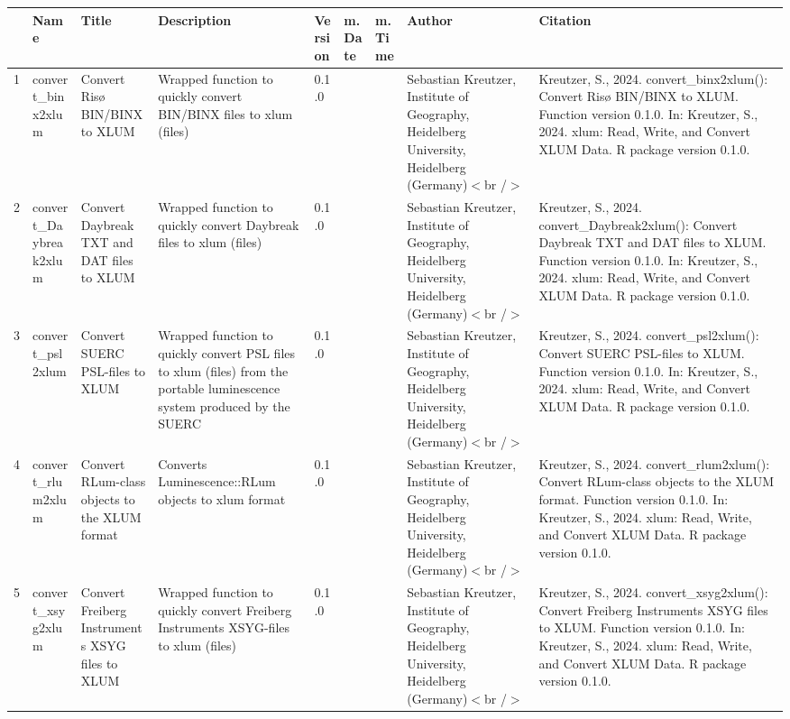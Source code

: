 \begin{table}[ht]
\centering
\begin{tabular}{rllllllll}
  \hline
 & Name & Title & Description & Version & m.Date & m.Time & Author & Citation \\ 
  \hline
1 & convert\_binx2xlum & Convert Risø BIN/BINX to XLUM & Wrapped function to quickly convert BIN/BINX files to  xlum  (files) & 0.1.0
 &  &  & Sebastian Kreutzer, Institute of Geography, Heidelberg University, Heidelberg (Germany)$<$br /$>$ & Kreutzer, S., 2024. convert\_binx2xlum(): Convert Risø BIN/BINX to XLUM. Function version 0.1.0. In: Kreutzer, S., 2024. xlum: Read, Write, and Convert XLUM Data. R package version 0.1.0. 
 \\ 
  2 & convert\_Daybreak2xlum & Convert Daybreak TXT and DAT files to XLUM & Wrapped function to quickly convert Daybreak files to  xlum  (files) & 0.1.0
 &  &  & Sebastian Kreutzer, Institute of Geography, Heidelberg University, Heidelberg (Germany)$<$br /$>$ & Kreutzer, S., 2024. convert\_Daybreak2xlum(): Convert Daybreak TXT and DAT files to XLUM. Function version 0.1.0. In: Kreutzer, S., 2024. xlum: Read, Write, and Convert XLUM Data. R package version 0.1.0. 
 \\ 
  3 & convert\_psl2xlum & Convert SUERC PSL-files to XLUM & Wrapped function to quickly convert PSL files to  xlum  (files) from the portable luminescence system produced by the SUERC & 0.1.0
 &  &  & Sebastian Kreutzer, Institute of Geography, Heidelberg University, Heidelberg (Germany)$<$br /$>$ & Kreutzer, S., 2024. convert\_psl2xlum(): Convert SUERC PSL-files to XLUM. Function version 0.1.0. In: Kreutzer, S., 2024. xlum: Read, Write, and Convert XLUM Data. R package version 0.1.0. 
 \\ 
  4 & convert\_rlum2xlum & Convert RLum-class objects to the XLUM format & Converts  Luminescence::RLum  objects to xlum format & 0.1.0
 &  &  & Sebastian Kreutzer, Institute of Geography, Heidelberg University, Heidelberg (Germany)$<$br /$>$ & Kreutzer, S., 2024. convert\_rlum2xlum(): Convert RLum-class objects to the XLUM format. Function version 0.1.0. In: Kreutzer, S., 2024. xlum: Read, Write, and Convert XLUM Data. R package version 0.1.0. 
 \\ 
  5 & convert\_xsyg2xlum & Convert Freiberg Instruments XSYG files to XLUM & Wrapped function to quickly convert Freiberg Instruments XSYG-files to  xlum  (files) & 0.1.0
 &  &  & Sebastian Kreutzer, Institute of Geography, Heidelberg University, Heidelberg (Germany)$<$br /$>$ & Kreutzer, S., 2024. convert\_xsyg2xlum(): Convert Freiberg Instruments XSYG files to XLUM. Function version 0.1.0. In: Kreutzer, S., 2024. xlum: Read, Write, and Convert XLUM Data. R package version 0.1.0. 

\end{tabular}
\end{table}
